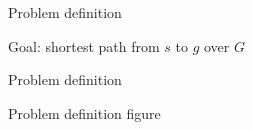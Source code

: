 \documentclass{presentation}
\begin{document}
\begin{frame}{Problem definition}
\begin{minipage}{0.6\textwidth}
	\end{minipage}
	
	\hspace{3cm}
	
	\pause
	\begin{center}
		Goal: shortest path from $s$ to $g$ over $G$
	\end{center}

\end{frame}

\begin{frame}{Problem definition}
\end{frame}

\begin{frame}{Problem definition}
	figure
\end{frame}


\begin{frame}
\end{frame}



\begin{frame}
\end{frame}



\begin{frame}
\end{frame}



\begin{frame}
\end{frame}



\begin{frame}
\end{frame}



\begin{frame}
\end{frame}
\end{document}
